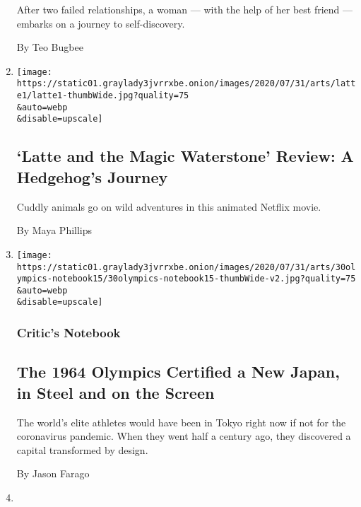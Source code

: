 \begin{enumerate}
  After two failed relationships, a woman --- with the help of her best
  friend --- embarks on a journey to self-discovery.

  By Teo Bugbee
\item
  \href{/2020/07/31/movies/latte-and-the-magic-waterstone-review.html}{}

  \texttt{[image: https://static01.graylady3jvrrxbe.onion/images/2020/07/31/arts/latte1/latte1-thumbWide.jpg?quality=75\\\&auto=webp\\\&disable=upscale]}

  \hypertarget{latte-and-the-magic-waterstone-review-a-hedgehogs-journey}{%
  \subsection{`Latte and the Magic Waterstone' Review: A Hedgehog's
  Journey}\label{latte-and-the-magic-waterstone-review-a-hedgehogs-journey}}

  Cuddly animals go on wild adventures in this animated Netflix movie.

  By Maya Phillips
\item
  \href{/2020/07/30/arts/design/tokyo-olympics-1964-design.html}{}

  \texttt{[image: https://static01.graylady3jvrrxbe.onion/images/2020/07/31/arts/30olympics-notebook15/30olympics-notebook15-thumbWide-v2.jpg?quality=75\\\&auto=webp\\\&disable=upscale]}

  \hypertarget{critics-notebook-1}{%
  \subsubsection{Critic's Notebook}\label{critics-notebook-1}}

  \hypertarget{the-1964-olympics-certified-a-new-japan-in-steel-and-on-the-screen}{%
  \subsection{The 1964 Olympics Certified a New Japan, in Steel and on
  the
  Screen}\label{the-1964-olympics-certified-a-new-japan-in-steel-and-on-the-screen}}

  The world's elite athletes would have been in Tokyo right now if not
  for the coronavirus pandemic. When they went half a century ago, they
  discovered a capital transformed by design.

  By Jason Farago
\item
  \href{/2020/07/30/movies/a-most-beautiful-thing-review.html}{}


\end{enumerate}
